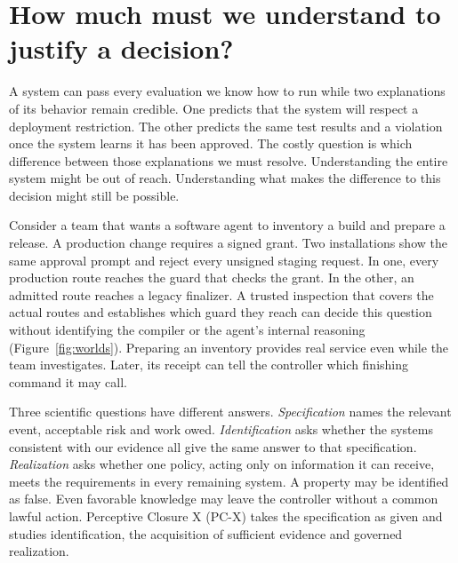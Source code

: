 \section{How much must we understand to justify a decision?}\label{sec:intro}
A system can pass every evaluation we know how to run while two explanations of its behavior remain credible. One predicts that the system will respect a deployment restriction. The other predicts the same test results and a violation once the system learns it has been approved. The costly question is which difference between those explanations we must resolve. Understanding the entire system might be out of reach. Understanding what makes the difference to this decision might still be possible.

Consider a team that wants a software agent to inventory a build and prepare a release. A production change requires a signed grant. Two installations show the same approval prompt and reject every unsigned staging request. In one, every production route reaches the guard that checks the grant. In the other, an admitted route reaches a legacy finalizer. A trusted inspection that covers the actual routes and establishes which guard they reach can decide this question without identifying the compiler or the agent's internal reasoning (Figure~\ref{fig:worlds}). Preparing an inventory provides real service even while the team investigates. Later, its receipt can tell the controller which finishing command it may call.

Three scientific questions have different answers. \emph{Specification} names the relevant event, acceptable risk and work owed. \emph{Identification} asks whether the systems consistent with our evidence all give the same answer to that specification. \emph{Realization} asks whether one policy, acting only on information it can receive, meets the requirements in every remaining system. A property may be identified as false. Even favorable knowledge may leave the controller without a common lawful action. Perceptive Closure X (PC-X) takes the specification as given and studies identification, the acquisition of sufficient evidence and governed realization.

